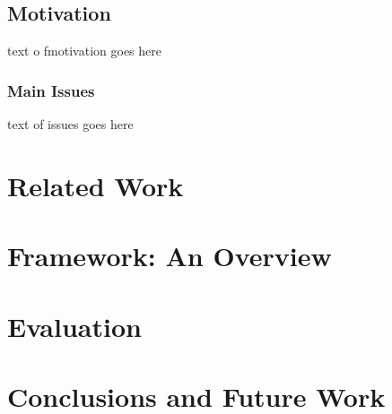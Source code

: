 \documentclass[12pt,twocolumn]{IEEEtran11}
\begin{document}
\subsection{Motivation}
text o fmotivation goes here

\subsubsection{Main Issues}
text of issues goes here

\section{Related Work}
\label{sec:rel-work}

\section{Framework: An Overview}
\label{sec:pals}

\section{Evaluation}
\label{sec:eval}

\section{Conclusions and Future Work}
\label{sec:-conc}


\end{document}

